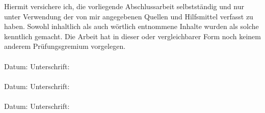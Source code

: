 Hiermit versichere ich, die vorliegende Abschlussarbeit selbstständig und nur unter Verwendung der von mir angegebenen Quellen und Hilfsmittel verfasst zu haben. Sowohl inhaltlich als auch wörtlich entnommene Inhalte wurden als solche kenntlich gemacht. Die Arbeit hat in dieser oder vergleichbarer Form noch keinem anderem Prüfungsgremium vorgelegen. \\
\\[1.5cm]
Datum:	\hrulefill\enspace Unterschrift: \hrulefill
\\[3.5cm]
\\[1.5cm]
Datum:	\hrulefill\enspace Unterschrift: \hrulefill
\\[3.5cm]
\\[1.5cm]
Datum:	\hrulefill\enspace Unterschrift: \hrulefill
\\[3.5cm]